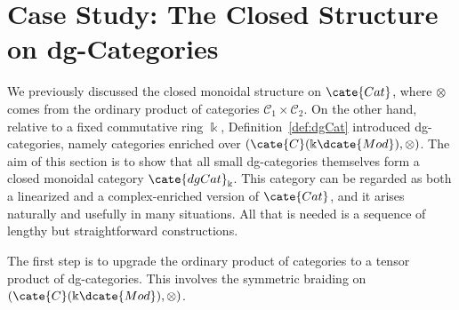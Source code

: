 
\section{Case Study: The Closed Structure on dg-Categories}\label{sec:dg-closed}
\hypertarget{o014.aljabr2.chapter7.closed-structure-dgcat}{ }
We previously discussed the closed monoidal structure on $\cate{Cat}$, where
$\otimes$ comes from the ordinary product of categories
$\mathcal{C}_1\times\mathcal{C}_2$. On the other hand, relative to a fixed
commutative ring $\Bbbk$, Definition~\ref{def:dgCat} introduced
dg-categories, namely categories enriched over
$(\cate{C}(\Bbbk\dcate{Mod}),\otimes)$. The aim of this section is to show
that all small dg-categories themselves form a closed monoidal category
$\cate{dgCat}_{\Bbbk}$. This category can be regarded as both a linearized
and a complex-enriched version of $\cate{Cat}$, and it arises naturally and
usefully in many situations. All that is needed is a sequence of lengthy but
straightforward constructions.

The first step is to upgrade the ordinary product of categories to a tensor
product of dg-categories. This involves the symmetric braiding on
$(\cate{C}(\Bbbk\dcate{Mod}),\otimes)$.

